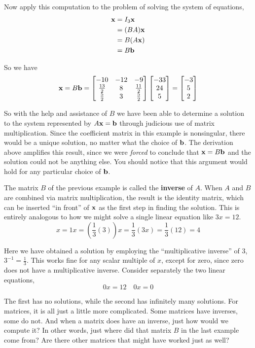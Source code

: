 \documentclass{ximera}
\begin{document}
\begin{example}
  Now apply this computation to the problem of solving the system of equations,
  \begin{align*}
    \mathbf{x}
    &=I_3\mathbf{x} \\ 
    &=(BA)\mathbf{x} \\
    &=B(A\mathbf{x}) \\
    &=B\mathbf{b}
  \end{align*}
  
  So we have
  \[
    \mathbf{x}=B\mathbf{b}=
    \begin{bmatrix}
      -10 & -12 & -9\\
      \frac{13}{2} & 8 & \frac{11}{2}\\
      \frac{5}{2} & 3 & \frac{5}{2}
    \end{bmatrix} \begin{bmatrix}-33\\24\\5\end{bmatrix} =
    \begin{bmatrix}-3\\5\\2\end{bmatrix}
  \]
  
  So with the help and assistance of $B$ we have been able to determine
  a solution to the system represented by $A\mathbf{x}=\mathbf{b}$ through
  judicious use of matrix multiplication.  Since the coefficient matrix
  in this example is nonsingular, there would be a unique solution, no
  matter what the choice of $\mathbf{b}$.  The derivation above amplifies
  this result, since we were \textit{forced} to conclude that
  $\mathbf{x}=B\mathbf{b}$ and the solution could not be anything else.  You
  should notice that this argument would hold for any particular choice
  of $\mathbf{b}$.
\end{example}

The matrix $B$ of the previous example is called the \textbf{inverse}
of $A$.  When $A$ and $B$ are combined via matrix multiplication, the
result is the identity matrix, which can be inserted ``in front'' of
$\mathbf{x}$ as the first step in finding the solution.  This is
entirely analogous to how we might solve a single linear equation like
$3x=12$.
\[
x=1x=\left(\frac{1}{3}\left(3\right)\right)x=\frac{1}{3}\left(3x\right)=\frac{1}{3}\left(12\right)=4
\]

Here we have obtained a solution by employing the ``multiplicative
inverse'' of $3$, $3^{-1}=\frac{1}{3}$.  This works fine for any
scalar multiple of $x$, except for zero, since zero does not have a
multiplicative inverse.  Consider separately the two linear equations,
\[
  0x=12
  \quad
  0x=0
\]

The first has no solutions, while the second has infinitely many
solutions.  For matrices, it is all just a little more complicated.
Some matrices have inverses, some do not.  And when a matrix does have
an inverse, just how would we compute it?  In other words, just where
did that matrix $B$ in the last example come from?  Are there other
matrices that might have worked just as well?
\end{document}
